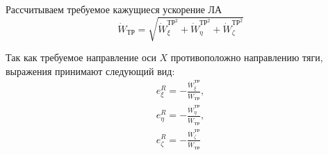 Рассчитываем требуемое кажущиеся ускорение ЛА
\begin{equation}
	\dot{W}_\text{ТР} = \sqrt{ \dot{W}^{\text{ТР}^2}_\xi + \dot{W}^{\text{ТР}^2}_\eta +\dot{W}^{\text{ТР}^2}_\zeta }
\end{equation}

Так как требуемое направление оси $X$ противоположно направлению тяги, выражения принимают следующий вид:
\begin{equation}
	\begin{gathered}
		e^R_\xi = - \frac{\dot{W}^\text{ТР}_\xi}{\dot{W}_\text{ТР}}, \\
		e^R_\eta = - \frac{\dot{W}^\text{ТР}_\eta}{\dot{W}_\text{ТР}}, \\
		e^R_\zeta = - \frac{\dot{W}^\text{ТР}_\zeta}{\dot{W}_\text{ТР}} \\
	\end{gathered}
\end{equation}
\clearpage
